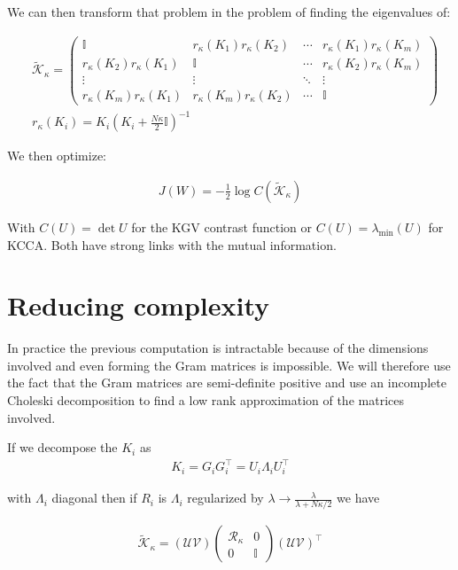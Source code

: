 \documentclass[a4paper,BCOR=5mm,oneside,openany]{scrreprt}
\begin{document}
We can then transform that problem in the problem of finding the eigenvalues of:
						
\begin{align*}
	&\tilde{\mathcal{K}}_\kappa = \begin{pmatrix}
		\mathbb{I} & r_\kappa (K_1)  r_\kappa (K_2)  & \cdots &  r_\kappa (K_1) r_\kappa (K_m)\\
		r_\kappa (K_2)  r_\kappa (K_1) & \mathbb{I} & \cdots & r_\kappa (K_2) r_\kappa (K_m) \\
		\vdots & \vdots & \ddots & \vdots \\
		r_\kappa (K_m)  r_\kappa (K_1) & r_\kappa (K_m) r_\kappa (K_2) & \cdots & \mathbb{I}
	\end{pmatrix} \\
	& r_\kappa (K_i) = K_i (K_i + \frac{N \kappa}{2} \mathbb{I})^{-1}
\end{align*}

We then optimize:

\begin{align*}
	J(W) = -\frac{1}{2} \log C \left( \tilde{\mathcal{K}}_\kappa \right)
\end{align*}

With $C(U) = \det U$ for the KGV contrast function or $C(U) = \lambda_\text{min} (U)$ for KCCA. Both have strong links with the mutual information.

\section{Reducing complexity}

In practice the previous computation is intractable because of the dimensions involved and even forming the Gram matrices is impossible. We will therefore use the fact that the Gram matrices are semi-definite positive and use an incomplete Choleski decomposition to find a low rank approximation of the matrices involved.

If we decompose the $K_i$ as
\begin{align*}
	K_i = G_i G_i^\intercal = U_i \Lambda_i U_i^\intercal
\end{align*}

with $\Lambda_i$ diagonal then if $R_i$ is $\Lambda_i$ regularized by $\lambda \to \frac{\lambda}{\lambda + N \kappa / 2}$ we have

\begin{align*}
	\tilde{\mathcal{K}}_\kappa = (\mathcal{U} \mathcal{V}) \begin{pmatrix}
		\mathcal{R}_\kappa & 0 \\
		0 & \mathbb{I}
	\end{pmatrix} (\mathcal{U} \mathcal{V})^\intercal
\end{align*}
\end{document}
